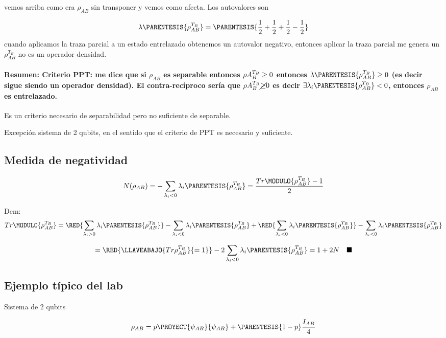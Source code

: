 vemos arriba como era $\rho_{AB}$ sin transponer y vemos como afecta.
Los autovalores son

\[
\lambda\PARENTESIS{\rho_{AB}^{T_{B}}}=\PARENTESIS{\frac{1}{2}+\frac{1}{2}+\frac{1}{2}-\frac{1}{2}}
\]
cuando aplicamos la traza parcial a un estado entrelazado obtenemos
un autovalor negativo, entonces aplicar la traza parcial me genera
un $\rho_{AB}^{T_{B}}$ no es un operador densidad.

\paragraph{Resumen: Criterio PPT: me dice que si $\rho_{AB}$ es separable entonces
$\rho A_{B}^{T_{B}}\protect\geq0$ entonces $\lambda\protect\PARENTESIS{\rho_{AB}^{T_{B}}}\protect\geq0$
(es decir sigue siendo un operador densidad). El contra-recíproco sería
que $\rho A_{B}^{T_{B}}\cancel{\protect\geq}0$ es decir $\exists\lambda_{i}\protect\PARENTESIS{\rho_{AB}^{T_{B}}}<0$,
entonces $\rho_{AB}$ es entrelazado.}

Es un criterio necesario de separabilidad pero no suficiente de separable.

Excepción sistema de 2 qubits, en el sentido que el criterio de PPT
es necesario y suficiente. 

\subsection{Medida de negatividad}

\[
N(\rho_{AB})=-\sum_{\lambda_{i}<0}\lambda_{i}\PARENTESIS{\rho_{AB}^{T_{B}}}=\frac{Tr\MODULO{\rho_{AB}^{T_{B}}}-1}{2}
\]

Dem: 
\[
Tr\MODULO{\rho_{AB}^{T_{B}}}=\RED{\sum_{\lambda_{i}>0}\lambda_{i}\PARENTESIS{\rho_{AB}^{T_{B}}}}-\sum_{\lambda_{i}<0}\lambda_{i}\PARENTESIS{\rho_{AB}^{T_{B}}}+\RED{\sum_{\lambda_{i}<0}\lambda_{i}\PARENTESIS{\rho_{AB}^{T_{B}}}}-\sum_{\lambda_{i}<0}\lambda_{i}\PARENTESIS{\rho_{AB}^{T_{B}}}
\]

\[
=\RED{\LLAVEABAJO{Tr\rho_{AB}^{T_{B}}}{=1}}-2\sum_{\lambda_{i}<0}\lambda_{i}\PARENTESIS{\rho_{AB}^{T_{B}}}=1+2N\quad\blacksquare
\]


\subsection{Ejemplo típico del lab}

Sistema de 2 qubits

\[
\rho_{AB}=p\PROYECT{\psi_{AB}}{\psi_{AB}}+\PARENTESIS{1-p}\frac{I_{AB}}{4}
\]


